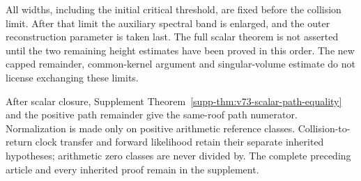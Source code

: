 \documentclass[11pt,reqno]{amsart}
\numberwithin{equation}{section}
\theoremstyle{definition}
\theoremstyle{remark}\newtheorem{remark}[theorem]{Remark}
\begin{document}
All widths, including the initial critical threshold, are fixed
before the collision limit. After that limit the auxiliary spectral
band is enlarged, and the outer reconstruction parameter is taken
last. The full scalar theorem is not asserted until the two remaining
height estimates have been proved in this order. The new capped
remainder, common-kernel argument and singular-volume estimate do not
license exchanging these limits.

After scalar closure, Supplement
Theorem~\ref{supp-thm:v73-scalar-path-equality} and the positive path
remainder give the same-roof path numerator. Normalization is made
only on positive arithmetic reference classes. Collision-to-return
clock transfer and forward likelihood retain their separate inherited
hypotheses; arithmetic zero classes are never divided by. The complete
preceding article and every inherited proof remain in the supplement.


\end{document}
